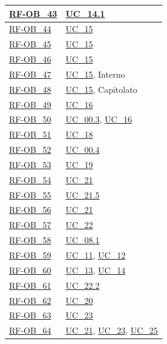 \begin{longtable}{|>{\raggedright}p{}|>{\raggedright\arraybackslash}p{}|}
    \hyperlink{rf-ob_43}{RF-OB\_43} & \hyperref[uc_14.1]{UC\_14.1} \\ \hline
    \hyperlink{rf-ob_44}{RF-OB\_44} & \hyperref[uc_15]{UC\_15} \\ \hline
    \hyperlink{rf-ob_45}{RF-OB\_45} & \hyperref[uc_15]{UC\_15} \\ \hline
    \hyperlink{rf-ob_46}{RF-OB\_46} & \hyperref[uc_15]{UC\_15} \\ \hline
    \hyperlink{rf-ob_47}{RF-OB\_47} & \hyperref[uc_15]{UC\_15}, Interno \\ \hline
    \hyperlink{rf-ob_48}{RF-OB\_48} & \hyperref[uc_15]{UC\_15}, Capitolato \\ \hline
    \hyperlink{rf-ob_49}{RF-OB\_49} & \hyperref[uc_16]{UC\_16} \\ \hline
    \hyperlink{rf-ob_50}{RF-OB\_50} & \hyperref[uc_00.3]{UC\_00.3}, \hyperref[uc_16]{UC\_16} \\ \hline
    \hyperlink{rf-ob_51}{RF-OB\_51} & \hyperref[uc_18]{UC\_18} \\ \hline
    \hyperlink{rf-ob_52}{RF-OB\_52} & \hyperref[uc_00.4]{UC\_00.4} \\ \hline
    \hyperlink{rf-ob_53}{RF-OB\_53} & \hyperref[uc_19]{UC\_19} \\ \hline
    \hyperlink{rf-ob_54}{RF-OB\_54} & \hyperref[uc_21]{UC\_21} \\ \hline
    \hyperlink{rf-ob_55}{RF-OB\_55} & \hyperref[uc_21.5]{UC\_21.5} \\ \hline
    \hyperlink{rf-ob_56}{RF-OB\_56} & \hyperref[uc_21]{UC\_21} \\ \hline
    \hyperlink{rf-ob_57}{RF-OB\_57} & \hyperref[uc_22]{UC\_22} \\ \hline
    \hyperlink{rf-ob_58}{RF-OB\_58} & \hyperref[uc_08.1]{UC\_08.1} \\ \hline
    \hyperlink{rf-ob_59}{RF-OB\_59} & \hyperref[uc_11]{UC\_11}, \hyperref[uc_12]{UC\_12} \\ \hline
    \hyperlink{rf-ob_60}{RF-OB\_60} & \hyperref[uc_13]{UC\_13}, \hyperref[uc_14]{UC\_14} \\ \hline
    \hyperlink{rf-ob_61}{RF-OB\_61} & \hyperref[uc_22.2]{UC\_22.2} \\ \hline
    \hyperlink{rf-ob_62}{RF-OB\_62} & \hyperref[uc_20]{UC\_20} \\ \hline
    \hyperlink{rf-ob_63}{RF-OB\_63} & \hyperref[uc_23]{UC\_23} \\ \hline
    \hyperlink{rf-ob_64}{RF-OB\_64} & \hyperref[uc_21]{UC\_21}, \hyperref[uc_23]{UC\_23}, \hyperref[uc_25]{UC\_25} \\ \hline

\end{longtable}
